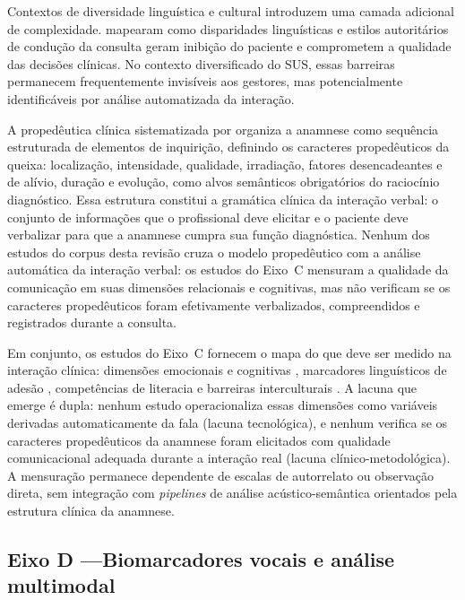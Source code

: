 \documentclass[a4paper,fleqn]{cas-sc}
\begin{document}
Contextos de diversidade linguística e cultural introduzem uma camada
adicional de complexidade. \citet{Alkhamees2023} mapearam como
disparidades linguísticas e estilos autoritários de condução da
consulta geram inibição do paciente e comprometem a qualidade das
decisões clínicas. No contexto diversificado do SUS, essas barreiras
permanecem frequentemente invisíveis aos gestores, mas
potencialmente identificáveis por análise automatizada da interação.

A propedêutica clínica sistematizada por \citet{Porto2019} organiza
a anamnese como sequência estruturada de elementos de inquirição,
definindo os caracteres propedêuticos da queixa: localização,
intensidade, qualidade, irradiação, fatores desencadeantes e de
alívio, duração e evolução, como alvos semânticos obrigatórios do
raciocínio diagnóstico. Essa estrutura constitui a gramática clínica
da interação verbal: o conjunto de informações que o profissional
deve elicitar e o paciente deve verbalizar para que a anamnese
cumpra sua função diagnóstica. Nenhum dos estudos do corpus desta
revisão cruza o modelo propedêutico com a análise automática da
interação verbal: os estudos do Eixo~C mensuram a qualidade da
comunicação em suas dimensões relacionais e cognitivas, mas não
verificam se os caracteres propedêuticos foram efetivamente
verbalizados, compreendidos e registrados durante a consulta.

Em conjunto, os estudos do Eixo~C fornecem o mapa do que deve ser
medido na interação clínica: dimensões emocionais e cognitivas
\citep{Kelley2014,Shao2025}, marcadores linguísticos de adesão
\citep{McCabe2018,Rucinski2022}, competências de literacia
\citep{Muscat2020} e barreiras interculturais \citep{Alkhamees2023}.
A lacuna que emerge é dupla: nenhum estudo operacionaliza essas
dimensões como variáveis derivadas automaticamente da fala
(lacuna tecnológica), e nenhum verifica se os caracteres
propedêuticos da anamnese \citep{Porto2019} foram elicitados com
qualidade comunicacional adequada durante a interação real
(lacuna clínico-metodológica). A mensuração permanece dependente de
escalas de autorrelato ou observação direta, sem integração com
\textit{pipelines} de análise acústico-semântica orientados pela
estrutura clínica da anamnese.

\subsection{Eixo D —Biomarcadores vocais e análise multimodal}
\label{subsec:eixoD}
\end{document}
